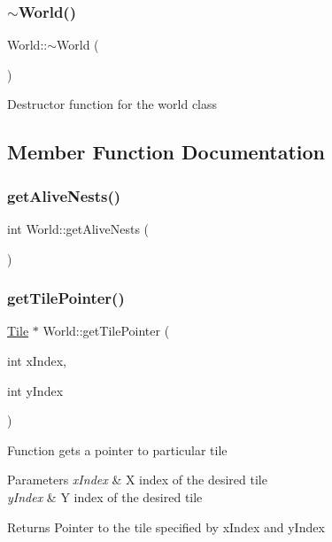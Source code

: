 \subsubsection{\texorpdfstring{$\sim$World()}{~World()}}
{\footnotesize\ttfamily World\+::$\sim$\+World (\begin{DoxyParamCaption}{ }\end{DoxyParamCaption})}



Destructor function for the world class 



\subsection{Member Function Documentation}
\mbox{\label{class_world_a5497532bf3e6e8db8632c653c53507cb}} 
\subsubsection{\texorpdfstring{getAliveNests()}{getAliveNests()}}
{\footnotesize\ttfamily int World\+::get\+Alive\+Nests (\begin{DoxyParamCaption}{ }\end{DoxyParamCaption})}

\mbox{\label{class_world_a889fd51cb49ca2bf86a00e521f51bc4f}} 
\subsubsection{\texorpdfstring{getTilePointer()}{getTilePointer()}}
{\footnotesize\ttfamily \mbox{\hyperlink{class_tile}{Tile}} $\ast$ World\+::get\+Tile\+Pointer (\begin{DoxyParamCaption}\item[{int}]{x\+Index,  }\item[{int}]{y\+Index }\end{DoxyParamCaption})}



Function gets a pointer to particular tile 


\begin{DoxyParams}{Parameters}
{\em x\+Index} & X index of the desired tile\\
\hline
{\em y\+Index} & Y index of the desired tile\\
\hline
\end{DoxyParams}
\begin{DoxyReturn}{Returns}
Pointer to the tile specified by x\+Index and y\+Index
\end{DoxyReturn}
\mbox{\label{class_world_abd388a26fed82873afb8ffcf4e44540a}} 

